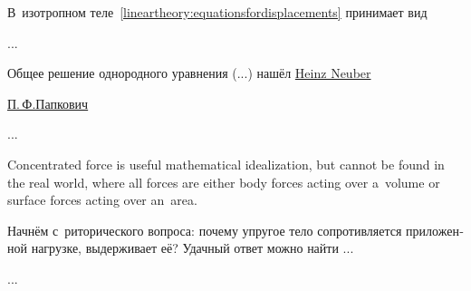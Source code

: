 \begin{otherlanguage}{russian}
В~изотропном теле~\eqref{lineartheory:equationsfordisplacements} принимает вид

...

Общее решение однородного уравнения (...) нашёл \href{https://de.wikipedia.org/wiki/Heinz_Neuber}{Heinz Neuber}

\href{https://ru.wikipedia.org/wiki/%D0%9F%D0%B0%D0%BF%D0%BA%D0%BE%D0%B2%D0%B8%D1%87,_%D0%9F%D1%91%D1%82%D1%80_%D0%A4%D1%91%D0%B4%D0%BE%D1%80%D0%BE%D0%B2%D0%B8%D1%87}{П.\,Ф.\:Папкович}

...



\end{otherlanguage}



{\small
Concentrated force is useful mathematical idealization, but cannot be found in the real world, where all forces are either body forces acting over a~volume or surface forces acting over an~area.
\par}

\begin{otherlanguage}{russian}

Начнём с~риторического вопроса: почему упругое тело сопротивляется приложенной нагрузке, выдерживает её? Удачный ответ можно найти ...

...



\end{otherlanguage}



\label{para:displacementsfromdeformations}

